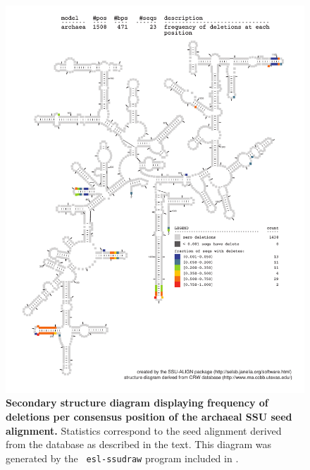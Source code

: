 \begin{figure}
\begin{center}
\includegraphics[width=5.7in]{Figures/archaea-0p1-dall}
\end{center}
\caption[Secondary structure diagram displaying frequency of deletions
  per consensus position of the archaeal SSU seed
  alignment]{\textbf{Secondary structure diagram displaying frequency 
  of deletions per consensus position of the archaeal SSU seed
  alignment.} Statistics correspond to the  seed
  alignment derived from the  database \cite{CannoneGutell02}
  as described in the text. This diagram was generated by the {\tt
  esl-ssudraw} program included in .}
\label{fig:arcdel}
\end{figure}


